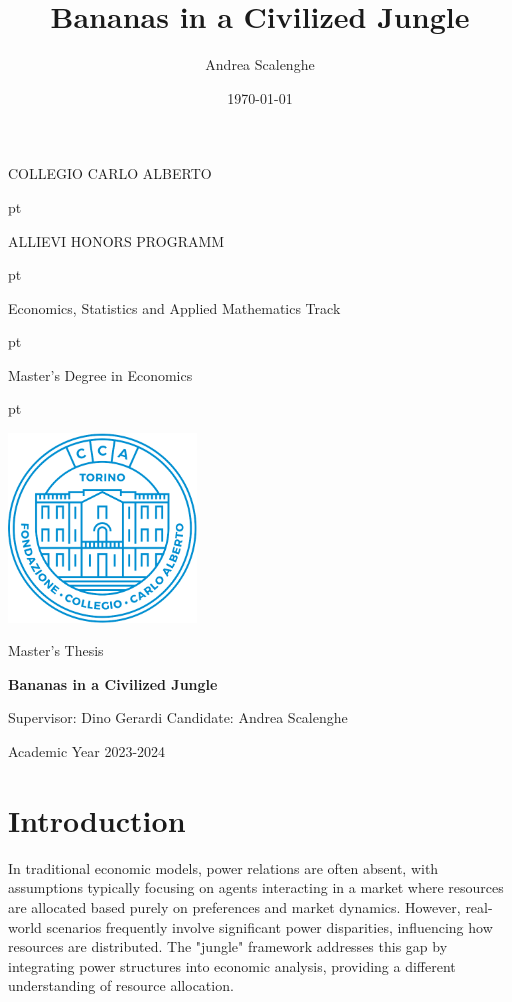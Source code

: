 \documentclass[12pt,a4paper]{article}
\title{Bananas in a Civilized Jungle}
\author{Andrea Scalenghe}
\date{\today}
\numberwithin{theorem}{section}
\numberwithin{definition}{section}
\numberwithin{example}{section}
\numberwithin{exercise}{section}
\begin{document}
\thispagestyle{empty}

\centerline {\Large{\textsc{COLLEGIO CARLO ALBERTO}}}
 pt

\centerline {\Large{\textsc ALLIEVI HONORS PROGRAMM}}

 pt

\centerline {{\textsc Economics, Statistics and Applied Mathematics Track}}

 pt

\centerline {\Large{\textsc Master's Degree in Economics}}
 pt





\centerline {\includegraphics[width=5cm]{cca.png}}

\vskip 1.2cm

\centerline {\normalsize {Master's Thesis}} 

\vskip 0.7cm

\centerline {\Large {\bf Bananas in a Civilized Jungle} }

\vskip 1.7cm

\noindent Supervisor: Dino Gerardi
\hfill  {Candidate: Andrea Scalenghe}

\vskip 2.7cm


\centerline{Academic Year 2023-2024}

\newpage
{
\hypersetup{linkcolor = black}
\tableofcontents
{}
}
\newpage

\section*{Introduction}

In traditional economic models, power relations are often absent, with assumptions typically focusing on agents interacting in a market where resources are allocated based purely on preferences and market dynamics. However, real-world scenarios frequently involve significant power disparities, influencing how resources are distributed. The "jungle" framework addresses this gap by integrating power structures into economic analysis, providing a different understanding of resource allocation.
\end{document}
